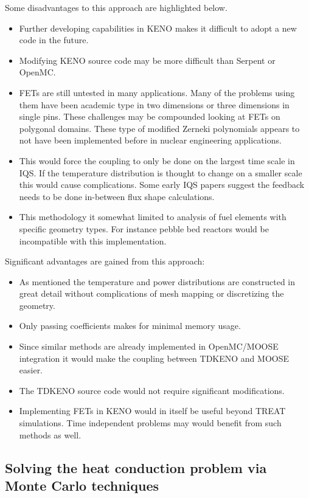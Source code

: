 \documentclass[11pt]{article}
\begin{document}
Some disadvantages to this approach are highlighted below.
	\begin{itemize}
	\item Further developing capabilities in KENO makes it difficult to adopt a new code in the future.
	\item Modifying KENO source code may be more difficult than Serpent or OpenMC.
	\item FETs are still untested in many applications.  Many of the problems using them have been academic type in two dimensions or three dimensions in single pins.  These challenges may be compounded looking at FETs on polygonal domains.  These type of modified Zerneki polynomials  appears to not have been implemented before in nuclear engineering applications. 
	\item This would force the coupling to only be done on the largest time scale in IQS.  If the temperature distribution is thought to change on a smaller scale this would cause complications.  Some early IQS papers suggest the feedback needs to be done in-between flux shape calculations. 
	\item This methodology it somewhat limited to analysis of fuel elements with specific geometry types.  For instance pebble bed reactors would be incompatible with this implementation.
	\end{itemize}

Significant advantages are gained from this approach:
	\begin{itemize}
	\item As mentioned the temperature and power distributions are constructed in great detail without complications of mesh mapping or discretizing the geometry.
	\item Only passing coefficients makes for minimal memory usage.
	\item Since similar methods are already implemented in  OpenMC/MOOSE integration it would make the coupling between TDKENO and MOOSE easier. 
	\item The TDKENO source code would not require significant modifications. 
	\item Implementing FETs in KENO would in itself be useful beyond TREAT simulations.  Time independent problems may would benefit from such methods as well. 
	\end{itemize}


\subsection{Solving the heat conduction problem via Monte Carlo techniques}
\end{document}
